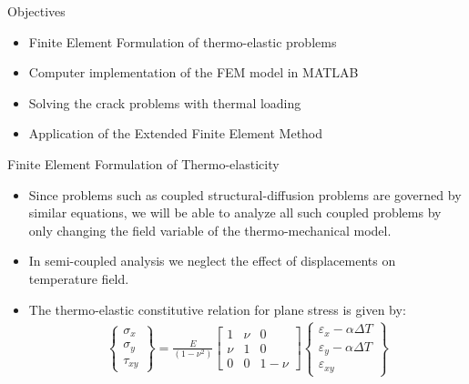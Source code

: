 \documentclass{beamer}
\begin{document}
\begin{frame}[t,fragile]{}
\end{frame}
\begin{frame}[t,fragile]{Objectives}
    \begin{itemize}
        \item Finite Element Formulation of thermo-elastic problems
        \item Computer implementation of the FEM model in MATLAB
        \item Solving the crack problems with thermal loading
        \item Application of the Extended Finite Element Method 
    \end{itemize}
\end{frame}
\begin{frame}[t,fragile]{Finite Element Formulation of Thermo-elasticity}
\begin{itemize}
    \item Since problems such as coupled structural-diffusion problems are governed by similar equations, we will be able to analyze all such coupled problems by only changing the field variable of the thermo-mechanical model.
\item In semi-coupled analysis we neglect the effect of displacements on temperature field. 
\item The thermo-elastic constitutive relation for plane stress is given by:
    \small
\begin{align*}
    \begin{Bmatrix}
        \sigma_{x}\\ \sigma_{y}\\ \tau_{xy} 
    \end{Bmatrix} =\frac{E}{(1-\nu^2)}
    \begin{bmatrix}
        1 & \nu & 0 \\ \nu & 1 & 0 \\ 0 & 0 & 1-\nu 
    \end{bmatrix}
    \begin{Bmatrix}
        \varepsilon_{x}-\alpha\Delta T \\ \varepsilon_{y}-\alpha \Delta T \\ \varepsilon_{xy} 
    \end{Bmatrix}
\end{align*}
\end{itemize}

\end{frame}
\end{document}
